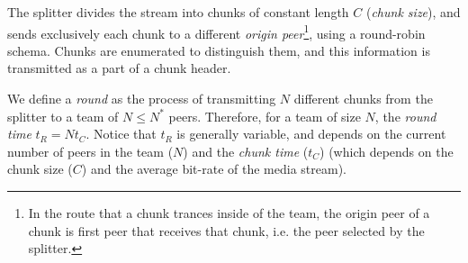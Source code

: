 
\label{sec:feeding_the_team}

The splitter divides the stream into chunks of constant length $C$
(\emph{chunk size}), and sends exclusively each chunk to a different
\emph{origin peer}\footnote{In the route that a chunk trances inside
  of the team, the origin peer of a chunk is first peer that receives
  that chunk, i.e. the peer selected by the splitter.}, using a
round-robin schema. Chunks are enumerated to distinguish them, and
this information is transmitted as a part of a chunk header.

\begin{comment}
More details about the implementation
are available in Fig.~\ref{fig:chunk_generation}.


\begin{figure*}
  \fig{500}{5cm}{DBS_splitter_feed} \caption{Chunk
    generation at the splitter and their transmission to the
    team.\label{fig:chunk_generation}}
\end{figure*}
\end{comment}

We define a \emph{round} as the process of transmitting $N$ different
chunks from the splitter to a team of $N\leq N^*$ peers. Therefore,
for a team of size $N$, the \emph{round time} $t_R=Nt_C$. Notice that
$t_R$ is generally variable, and depends on the current number of
peers in the team ($N$) and the \emph{chunk time} ($t_C$) (which
depends on the chunk size ($C$) and the average bit-rate of the media
stream).


\begin{comment}
(in a team) as the time necessary to send two consecutive chunks from
  the splitter (of such team) to the same peer, using the
  round-robing. This time is variable and depends on $|T|$, $C$, and
  the average bit-rate of the media, $A$.
\end{comment}

\begin{comment}
The round-time is defined by:
\begin{equation}
  \cal{r} = \cal{c}N.
  \label{eq:round_time}
\end{equation}
For example, if we use only one team of $N=256$ peers, a chunk size
$C=1024$~bytes, and a video of $1$~Mb/s, the round time is
\begin{displaymath}
  \cal{r} = \frac{1024\frac{\text{bytes}}{\text{chunk}}\times
    8\frac{\text{bits}}{\text{byte}}}{10^6\frac{\text{bits}}{\text{second}}}\times
  256 \approx 2.1~\text{seconds}.
\end{displaymath}
\end{comment}
